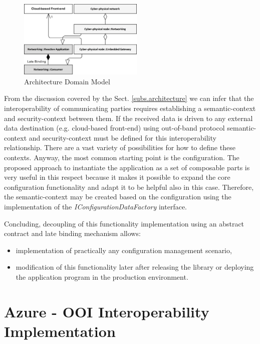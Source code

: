 \documentclass[runningheads]{llncs}
\begin{document}
\begin{figure}
      \centering
      \includegraphics[width=0.53\textwidth]{../../.Media/ImplementationDomainModel.png}
      \caption{Architecture Domain Model}\label{figure3.ImplementationDomainModel}
\end{figure}

From the discussion covered by the Sect. \ref{subs.architecture} we can infer that the interoperability of communicating parties requires establishing a semantic-context and security-context between them. If the received data is driven to any external data destination (e.g. cloud-based front-end) using out-of-band protocol semantic-context and security-context must be defined for this interoperability relationship. There are a vast variety of possibilities for how to define these contexts. Anyway, the most common starting point is the configuration. The proposed approach to instantiate the application as a set of composable parts is very useful in this respect because it makes it possible to expand the core configuration functionality and adapt it to be helpful also in this case. Therefore, the semantic-context may be created based on the configuration using the implementation of the \emph{IConfigurationDataFactory} interface.

Concluding, decoupling of this functionality implementation using an abstract contract and late binding mechanism allows:

\begin{itemize}
      \item implementation of practically any configuration management scenario,
      \item modification of this functionality later after releasing the library or deploying the application program in the production environment.
\end{itemize}

\section{Azure - OOI Interoperability Implementation}\label{section.gateway-implementation}
\end{document}
